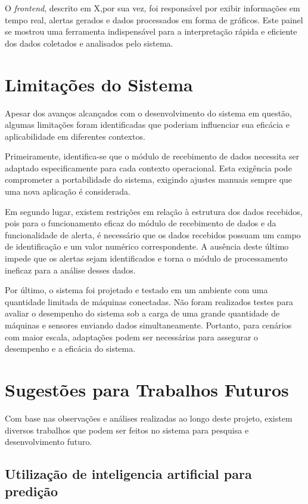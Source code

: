 O \emph{frontend}, descrito em X,por sua vez, foi responsável por exibir informações em tempo real, alertas gerados e dados processados em forma de gráficos. Este painel se mostrou uma ferramenta indispensável para a interpretação rápida e eficiente dos dados coletados e analisados pelo sistema.

\section{Limitações do Sistema}\label{sec:limitations}

Apesar dos avanços alcançados com o desenvolvimento do sistema em questão, algumas limitações foram identificadas que poderiam influenciar sua eficácia e aplicabilidade em diferentes contextos.

Primeiramente, identifica-se que o módulo de recebimento de dados necessita ser adaptado especificamente para cada contexto operacional. Esta exigência pode comprometer a portabilidade do sistema, exigindo ajustes manuais sempre que uma nova aplicação é considerada.

Em segundo lugar, existem restrições em relação à estrutura dos dados recebidos, pois para o funcionamento eficaz do módulo de recebimento de dados e da funcionalidade de alerta, é necessário que os dados recebidos possuam um campo de identificação e um valor numérico correspondente. A ausência deste último impede que os alertas sejam identificados e torna o módulo de processamento ineficaz para a análise desses dados.

Por último, o sistema foi projetado e testado em um ambiente com uma quantidade limitada de máquinas conectadas. Não foram realizados testes para avaliar o desempenho do sistema sob a carga de uma grande quantidade de máquinas e sensores enviando dados simultaneamente. Portanto, para cenários com maior escala, adaptações podem ser necessárias para assegurar o desempenho e a eficácia do sistema.


\section{Sugestões para Trabalhos Futuros}\label{sec:future_work}

Com base nas observações e análises realizadas ao longo deste projeto, existem diversos trabalhos que podem ser feitos no sistema para pesquisa e desenvolvimento futuro.


\subsection{Utilização de inteligencia artificial para predição}

